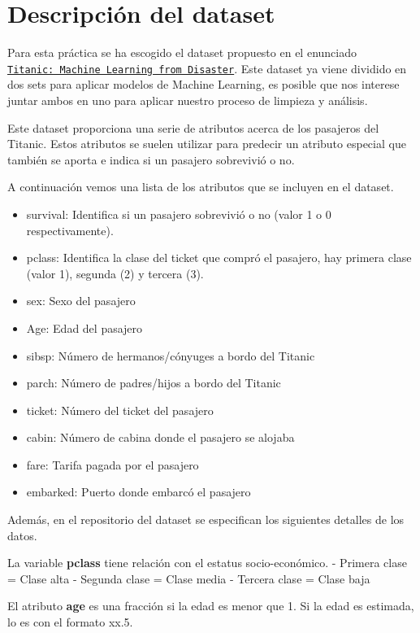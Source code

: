 \documentclass[11pt]{article}
\providecommand{\tightlist}{%
      \setlength{\itemsep}{0pt}\setlength{\parskip}{0pt}}
\begin{document}
\hypertarget{descripciuxf3n-del-dataset}{%
\section{Descripción del dataset}\label{descripciuxf3n-del-dataset}}

Para esta práctica se ha escogido el dataset propuesto en el enunciado
\href{https://www.kaggle.com/c/titanic}{\texttt{Titanic:\ Machine\ Learning\ from\ Disaster}}.
Este dataset ya viene dividido en dos sets para aplicar modelos de
Machine Learning, es posible que nos interese juntar ambos en uno para
aplicar nuestro proceso de limpieza y análisis.

Este dataset proporciona una serie de atributos acerca de los pasajeros
del Titanic. Estos atributos se suelen utilizar para predecir un
atributo especial que también se aporta e indica si un pasajero
sobrevivió o no.

A continuación vemos una lista de los atributos que se incluyen en el
dataset.

\begin{itemize}
\tightlist
\item
  survival: Identifica si un pasajero sobrevivió o no (valor 1 o 0
  respectivamente).
\item
  pclass: Identifica la clase del ticket que compró el pasajero, hay
  primera clase (valor 1), segunda (2) y tercera (3).
\item
  sex: Sexo del pasajero
\item
  Age: Edad del pasajero
\item
  sibsp: Número de hermanos/cónyuges a bordo del Titanic
\item
  parch: Número de padres/hijos a bordo del Titanic
\item
  ticket: Número del ticket del pasajero
\item
  cabin: Número de cabina donde el pasajero se alojaba
\item
  fare: Tarifa pagada por el pasajero
\item
  embarked: Puerto donde embarcó el pasajero
\end{itemize}

Además, en el repositorio del dataset se especifican los siguientes
detalles de los datos.

La variable \textbf{pclass} tiene relación con el estatus
socio-económico. - Primera clase = Clase alta - Segunda clase = Clase
media - Tercera clase = Clase baja

El atributo \textbf{age} es una fracción si la edad es menor que 1. Si
la edad es estimada, lo es con el formato xx.5.
\end{document}
